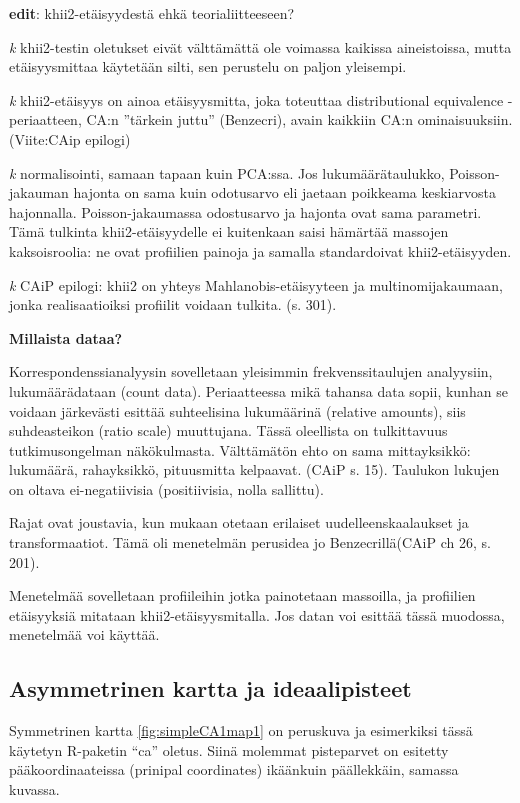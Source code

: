 \documentclass[
  finnish,
]{book}
\begin{document}
\textbf{edit}: khii2-etäisyydestä ehkä teorialiitteeseen?

\emph{k} khii2-testin oletukset eivät välttämättä ole voimassa kaikissa aineistoissa,
mutta etäisyysmittaa käytetään silti, sen perustelu on paljon yleisempi.

\emph{k} khii2-etäisyys on ainoa etäisyysmitta, joka toteuttaa distributional
equivalence - periaatteen, CA:n ''tärkein juttu'' (Benzecri), avain kaikkiin CA:n
ominaisuuksiin. (Viite:CAip epilogi)

\emph{k} normalisointi, samaan tapaan kuin PCA:ssa. Jos lukumäärätaulukko,
Poisson-jakauman hajonta on sama kuin odotusarvo eli jaetaan poikkeama
keskiarvosta hajonnalla. Poisson-jakaumassa odostusarvo ja hajonta ovat sama
parametri. Tämä tulkinta khii2-etäisyydelle ei kuitenkaan saisi hämärtää massojen
kaksoisroolia: ne ovat profiilien painoja ja samalla standardoivat khii2-etäisyyden.

\emph{k} CAiP epilogi: khii2 on yhteys Mahlanobis-etäisyyteen ja multinomijakaumaan,
jonka realisaatioiksi profiilit voidaan tulkita. (s. 301).

\textbf{Millaista dataa?}

Korrespondenssianalyysin sovelletaan yleisimmin frekvenssitaulujen analyysiin,
lukumäärädataan (count data). Periaatteessa mikä tahansa data sopii, kunhan se
voidaan järkevästi esittää suhteelisina lukumäärinä (relative amounts), siis
suhdeasteikon (ratio scale) muuttujana. Tässä oleellista on tulkittavuus
tutkimusongelman näkökulmasta. Välttämätön ehto on sama mittayksikkö: lukumäärä,
rahayksikkö, pituusmitta kelpaavat. (CAiP s. 15). Taulukon lukujen on oltava
ei-negatiivisia (positiivisia, nolla sallittu).

Rajat ovat joustavia, kun mukaan otetaan erilaiset uudelleenskaalaukset
ja transformaatiot. Tämä oli menetelmän perusidea jo Benzecrillä(CAiP ch 26, s. 201).

Menetelmää sovelletaan profiileihin jotka painotetaan massoilla, ja
profiilien etäisyyksiä mitataan khii2-etäisyysmitalla. Jos datan voi esittää
tässä muodossa, menetelmää voi käyttää.

\hypertarget{asymmetrinen-kartta-ja-ideaalipisteet}{%
\subsection{Asymmetrinen kartta ja ideaalipisteet}\label{asymmetrinen-kartta-ja-ideaalipisteet}}

Symmetrinen kartta \ref{fig:simpleCA1map1} on peruskuva ja esimerkiksi tässä
käytetyn R-paketin ``ca'' oletus. Siinä molemmat pisteparvet on esitetty
pääkoordinaateissa (prinipal coordinates) ikäänkuin päällekkäin, samassa kuvassa.
\end{document}
